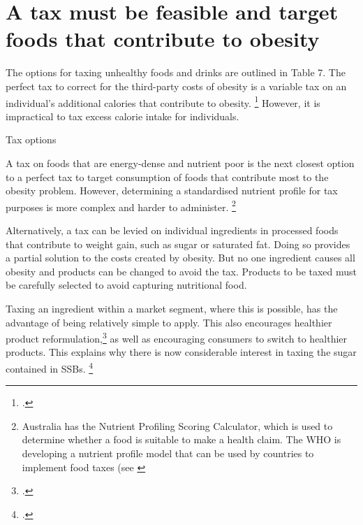 \documentclass[embargoed]{grattan}
\begin{document}
\section{A tax must be feasible and target foods that contribute to obesity }\label{a-tax-must-be-feasible-and-target-foods-that-contribute-to-obesity}

The options for taxing unhealthy foods and drinks are outlined in Table 7.
The perfect tax to correct for the third-party costs of obesity is a variable tax on an individual's additional calories that contribute to obesity.%
\footcite{Freebairn2010Taxationobesity} However, it is impractical to tax excess calorie intake for individuals.

\begin{table}
\caption{Tax options}



\end{table}

A tax on foods that are energy-dense and nutrient poor is the next closest option to a perfect tax to target consumption of foods that contribute most to the obesity problem.
However, determining a standardised nutrient profile for tax purposes is more complex and harder to administer.%
\footnote{Australia has the Nutrient Profiling Scoring Calculator, which is used to determine whether a food is suitable to make a health claim.
The WHO is developing a nutrient profile model that can be used by countries to implement food taxes (see \textcite{Organization2016FiscalPoliciesDiet}}

Alternatively, a tax can be levied on individual ingredients in processed foods that contribute to weight gain, such as sugar or saturated fat.
Doing so provides a partial solution to the costs created by obesity.
But no one ingredient causes all obesity and products can be changed to avoid the tax.
Products to be taxed must be carefully selected to avoid capturing nutritional food.

Taxing an ingredient within a market segment, where this is possible, has the advantage of being relatively simple to apply.
This also encourages healthier product reformulation,\footcite{Team2016Sugarlevyworking} as well as encouraging consumers to switch to healthier products.
This explains why there is now considerable interest in taxing the sugar contained in SSBs.%
\footcites{Smith2016SoftDrinksLevy}{SouthAfricaNationalTreasury2016TaxationSugarSweetened}
\end{document}
